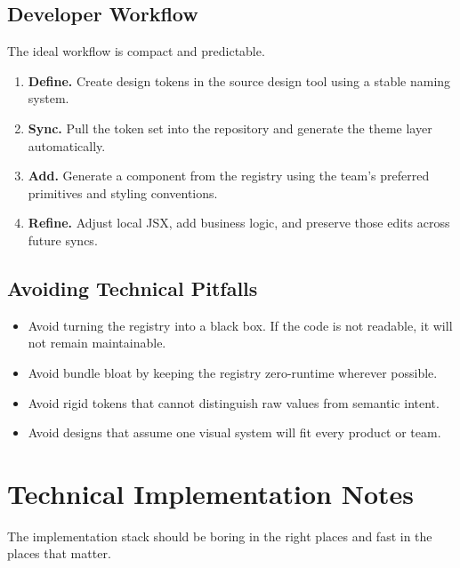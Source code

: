 \documentclass[11pt,twoside,a4paper]{article}
\begin{document}
\subsection{Developer Workflow}
The ideal workflow is compact and predictable.

\begin{enumerate}[leftmargin=*, itemsep=0.5em]
  \item \textbf{Define.} Create design tokens in the source design tool using a stable naming system.
  \item \textbf{Sync.} Pull the token set into the repository and generate the theme layer automatically.
  \item \textbf{Add.} Generate a component from the registry using the team's preferred primitives and styling conventions.
  \item \textbf{Refine.} Adjust local JSX, add business logic, and preserve those edits across future syncs.
\end{enumerate}

\subsection{Avoiding Technical Pitfalls}
\begin{itemize}[leftmargin=*, itemsep=0.35em]
  \item Avoid turning the registry into a black box. If the code is not readable, it will not remain maintainable.
  \item Avoid bundle bloat by keeping the registry zero-runtime wherever possible.
  \item Avoid rigid tokens that cannot distinguish raw values from semantic intent.
  \item Avoid designs that assume one visual system will fit every product or team.
\end{itemize}

\section{Technical Implementation Notes}
The implementation stack should be boring in the right places and fast in the places that matter.
\end{document}
